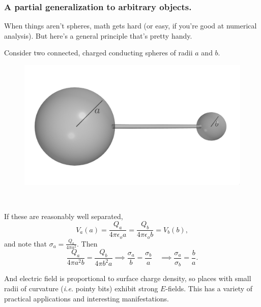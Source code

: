 \documentclass{article}
\begin{document}
\newpage

\subsubsection*{A partial generalization to arbitrary objects.}

When things aren't spheres, math gets hard (or easy, if you're good at numerical analysis). But here's a general principle that's pretty handy.

\vspace{1em}

Consider two connected, charged conducting spheres of radii $a$ and $b$.

\begin{minipage}{0.4\textwidth}
\begin{figure}[H]
\centering
    \includegraphics[width=\textwidth]{figures/6l9.png}
\end{figure}
\end{minipage}
~
\begin{minipage}{0.5\textwidth}
If these are reasonably well separated,
\begin{equation*}
    V_a (a) = \frac{Q_a}{4\pi\epsilon_o a} = \frac{Q_b}{4\pi\epsilon_o b} = V_b(b),
\end{equation*}
and note that $\sigma_a = \frac{Q_a}{4\pi a^2}$. Then
\begin{equation*}
    \frac{Q_a}{4\pi a^2 b} = \frac{Q_b}{4\pi b^2 a} \implies \frac{\sigma_a}{b} = \frac{\sigma_b}{a} \quad \implies \frac{\sigma_a}{\sigma_b} = \frac{b}{a}.
\end{equation*}
\end{minipage}

\vspace{2em}

And electric field is proportional to surface charge density, so places with small radii of curvature (\textit{i.e.} pointy bits) exhibit strong $E$-fields. This has a variety of practical applications and interesting manifestations.
\end{document}
